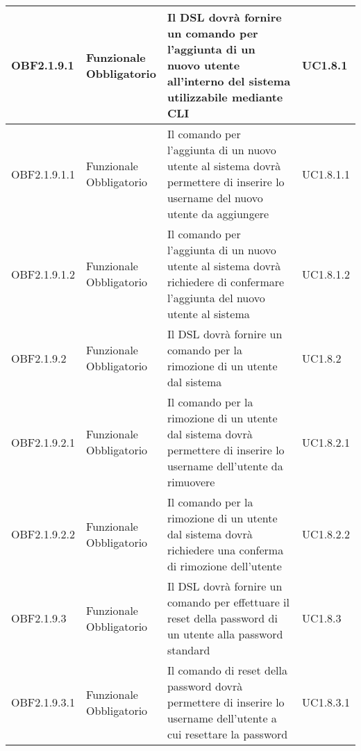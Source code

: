 \documentclass{scalatekids-article}
\begin{document}
\begin{longtable}[H]{|l|p{2cm}|p{6cm}|p{4cm}|}
\hline
OBF2.1.9.1 & \multiLineCell{Funzionale\\Obbligatorio} & Il DSL dovrà fornire un comando per l'aggiunta di un nuovo utente all'interno del sistema utilizzabile mediante CLI & \multiLineCell{UC1.8.1\\}\\
\hline
OBF2.1.9.1.1 & \multiLineCell{Funzionale\\Obbligatorio} & Il comando per l'aggiunta di un nuovo utente al sistema dovrà permettere di inserire lo username del nuovo utente da aggiungere & \multiLineCell{UC1.8.1.1\\}\\
\hline
OBF2.1.9.1.2 & \multiLineCell{Funzionale\\Obbligatorio} & Il comando per l'aggiunta di un nuovo utente al sistema dovrà richiedere di confermare l'aggiunta del nuovo utente al sistema & \multiLineCell{UC1.8.1.2\\}\\
\hline
OBF2.1.9.2 & \multiLineCell{Funzionale\\Obbligatorio} & Il DSL dovrà fornire un comando per la rimozione di un utente dal sistema & \multiLineCell{UC1.8.2\\}\\
\hline
OBF2.1.9.2.1 & \multiLineCell{Funzionale\\Obbligatorio} & Il comando per la rimozione di un utente dal sistema dovrà permettere di inserire lo username dell'utente da rimuovere & \multiLineCell{UC1.8.2.1\\}\\
\hline
OBF2.1.9.2.2 & \multiLineCell{Funzionale\\Obbligatorio} & Il comando per la rimozione di un utente dal sistema dovrà richiedere una conferma di rimozione dell'utente & \multiLineCell{UC1.8.2.2\\}\\
\hline
OBF2.1.9.3 & \multiLineCell{Funzionale\\Obbligatorio} & Il DSL dovrà fornire un comando per effettuare il reset della password di un utente alla password standard & \multiLineCell{UC1.8.3\\}\\
\hline
OBF2.1.9.3.1 & \multiLineCell{Funzionale\\Obbligatorio} & Il comando di reset della password dovrà permettere di inserire lo username dell'utente a cui resettare la password & \multiLineCell{UC1.8.3.1\\}\\

\end{longtable}
\end{document}
